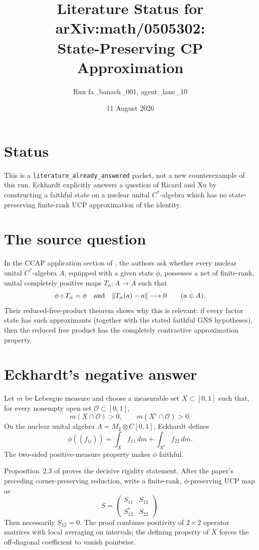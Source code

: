 \documentclass[11pt]{article}
\title{Literature Status for arXiv:math/0505302:\\State-Preserving CP Approximation}
\author{Run fa\_banach\_001, agent\_lane\_10}
\date{11 August 2026}
\begin{document}
\maketitle

\section*{Status}

This is a \texttt{literature\_already\_answered} packet, not a new
counterexample of this run.  Eckhardt \cite{Eckhardt} explicitly answers a
question of Ricard and Xu \cite{RX} by constructing a faithful state on a
nuclear unital $C^*$-algebra which has no state-preserving finite-rank UCP
approximation of the identity.

\section*{The source question}

In the CCAP application section of \cite{RX}, the authors ask whether every
nuclear unital $C^*$-algebra $A$, equipped with a given state $\phi$, possesses
a net of finite-rank, unital completely positive maps $T_\alpha:A\to A$ such
that
\[
 \phi\circ T_\alpha=\phi
 \quad\hbox{and}\quad
 \|T_\alpha(a)-a\|\longrightarrow0\qquad(a\in A).
\]
Their reduced-free-product theorem shows why this is relevant: if every factor
state has such approximants (together with the stated faithful GNS hypotheses),
then the reduced free product has the completely contractive approximation
property.

\section*{Eckhardt's negative answer}

Let $m$ be Lebesgue measure and choose a measurable set $X\subset[0,1]$ such
that, for every nonempty open set $\mathcal O\subset[0,1]$,
\[
 m(X\cap\mathcal O)>0,
 \qquad
 m(X^c\cap\mathcal O)>0.
\]
On the nuclear unital algebra $A=M_2\otimes C[0,1]$, Eckhardt defines
\begin{equation}\label{eq:state}
 \phi((f_{ij}))=\int_X f_{11}\,dm+\int_{X^c}f_{22}\,dm.
\end{equation}
The two-sided positive-measure property makes $\phi$ faithful.

Proposition~2.3 of \cite{Eckhardt} proves the decisive rigidity statement.
After the paper's preceding corner-preserving reduction, write a finite-rank,
$\phi$-preserving UCP map as
\[
 S=\begin{pmatrix}S_{11}&S_{12}\\S_{12}^*&S_{22}\end{pmatrix}.
\]
Then necessarily $S_{12}=0$.  The proof combines positivity of $2\times2$
operator matrices with local averaging on intervals; the defining property of
$X$ forces the off-diagonal coefficient to vanish pointwise.
\end{document}
